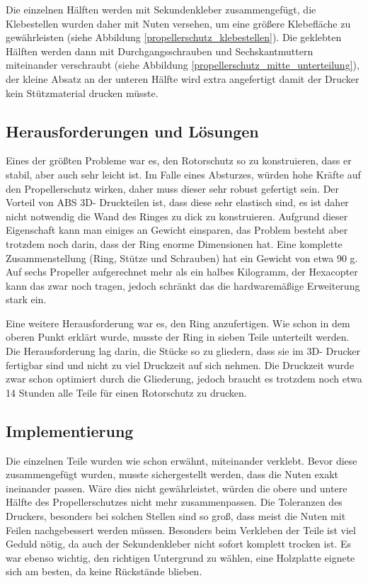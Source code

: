	Die einzelnen Hälften  werden mit Sekundenkleber zusammengefügt, die Klebestellen wurden daher mit Nuten versehen,
	um eine größere Klebefläche zu gewährleisten (siehe Abbildung \ref{propellerschutz_klebestellen}).
	Die geklebten Hälften werden dann mit Durchgangsschrauben und Sechskantmuttern miteinander verschraubt (siehe Abbildung  \ref{propellerschutz_mitte_unterteilung}),
	der kleine Absatz an der unteren Hälfte wird extra angefertigt damit der Drucker kein Stützmaterial drucken müsste.

			\newpage

	\subsection{Herausforderungen und Lösungen}

	Eines der größten Probleme war es, den Rotorschutz so zu konstruieren, dass er stabil, aber auch sehr leicht ist.
	Im Falle eines Absturzes, würden hohe Kräfte auf den Propellerschutz wirken, daher muss dieser sehr robust gefertigt sein.
	Der Vorteil von ABS \bzw 3D- Druckteilen ist, dass diese sehr elastisch sind, es ist daher nicht notwendig die Wand des Ringes zu dick zu konstruieren.
 	Aufgrund dieser Eigenschaft kann man einiges an Gewicht einsparen, das Problem besteht aber trotzdem noch darin, dass der Ring enorme Dimensionen hat.
	Eine komplette Zusammenstellung (Ring, Stütze und Schrauben) hat ein Gewicht von etwa 90 g.
	Auf sechs Propeller aufgerechnet mehr als ein halbes Kilogramm, der Hexacopter kann das zwar noch tragen, jedoch schränkt das die hardwaremäßige Erweiterung stark ein.

	Eine weitere Herausforderung war es, den Ring anzufertigen. Wie schon in dem oberen Punkt erklärt wurde, musste der Ring in sieben Teile unterteilt werden.
	Die Herausforderung lag darin, die Stücke so zu gliedern, dass sie im 3D- Drucker fertigbar sind und nicht zu viel Druckzeit auf sich nehmen.
	Die Druckzeit wurde zwar schon optimiert durch die Gliederung, jedoch braucht es trotzdem noch etwa 14 Stunden alle Teile für einen Rotorschutz zu drucken.

	\subsection{Implementierung}

Die einzelnen Teile wurden wie schon erwähnt, miteinander verklebt. Bevor diese zusammengefügt wurden, musste sichergestellt werden, dass die Nuten exakt ineinander passen.
Wäre dies nicht gewährleistet, würden die obere und untere Hälfte des Propellerschutzes nicht mehr zusammenpassen.
Die Toleranzen des Druckers, besonders bei solchen Stellen sind so groß, dass meist die Nuten mit Feilen nachgebessert werden müssen.
Besonders beim Verkleben der Teile ist viel Geduld nötig, da auch der Sekundenkleber nicht sofort komplett trocken ist.
Es war ebenso wichtig, den richtigen Untergrund zu wählen, eine Holzplatte eignete sich am besten, da keine Rückstände blieben.

